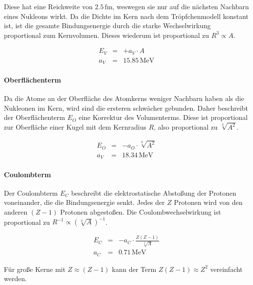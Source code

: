 \documentclass[12pt,a4paper]{scrartcl}
\numberwithin{equation}{section} %
\begin{document}
Diese hat eine Reichweite von $2.5\mathrm{\,fm}$, weswegen sie nur auf die nächsten Nachbarn eines Nukleons wirkt. Da die Dichte im Kern nach dem Tröpfchenmodell konstant ist, ist die gesamte Bindungsenergie durch die starke Wechselwirkung proportional zum Kernvolumen. Dieses wiederum ist proportional zu $R^3\propto A$.

\begin{eqnarray}
    E_V &=& + a_V\cdot A \label{Volumenterm} \\
    a_V &=& 15.85\mathrm{\,MeV}
\end{eqnarray}

\hypertarget{oberfluxe4chenterm}{%
\paragraph{Oberflächenterm}\label{oberfluxe4chenterm}}

Da die Atome an der Oberfläche des Atomkerns weniger Nachbarn haben als die Nukleonen im Kern, wird sind die ersteren schwächer gebunden. Daher beschreibt der Oberflächenterm $E_O$ eine Korrektur des Volumenterms. Diese ist proportional zur Oberfläche einer Kugel mit dem Kernradius $R$, also proportional zu $\sqrt[3]{A^2}$.

\begin{eqnarray}
    E_O &=& - a_O\cdot \sqrt[3]{A^2} \label{Oberflächenterm} \\
    a_V &=& 18.34\mathrm{\,MeV}
\end{eqnarray}

\hypertarget{coulombterm}{%
\paragraph{Coulombterm}\label{coulombterm}}

Der Coulombterm $E_C$ beschreibt die elektrostatische Abstoßung der Protonen voneinander, die die Bindungsenergie senkt. Jedes der $Z$ Protonen wird von den anderen $(Z-1)$ Protonen abgestoßen. Die Coulombwechselwirkung ist proportional zu $R^{-1}\propto\left(\sqrt[3]{A}\right)^{-1}$.

\begin{eqnarray}
    E_C &=& - a_C\cdot \frac{Z(Z-1)}{\sqrt[3]{A}} \label{Coulombterm} \\
    a_C &=& 0.71\mathrm{\,MeV}
\end{eqnarray}

\noindent
Für große Kerne mit $Z\approx(Z-1)$ kann der Term $Z(Z-1)\approx Z^2$ vereinfacht werden.
\end{document}
